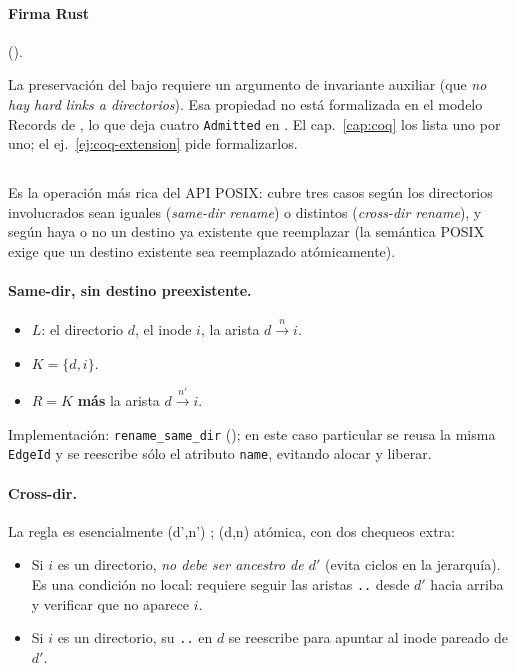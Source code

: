 \paragraph{Firma Rust} ().

\begin{observacion}
\label{obs:rmdir-coq}
La preservación del  bajo \oprmdir{} requiere
un argumento de invariante auxiliar (que \emph{no hay hard links a
directorios}). Esa propiedad no está formalizada en el modelo Records
de , lo que deja cuatro \texttt{Admitted} en
. El cap.~\ref{cap:coq} los lista uno por uno; el
ej.~\ref{ej:coq-extension} pide formalizarlos.
\end{observacion}

\subsection{\oprename}

Es la operación más rica del API POSIX: cubre tres casos según los
directorios involucrados sean iguales (\emph{same-dir rename}) o
distintos (\emph{cross-dir rename}), y según haya o no un destino
ya existente que reemplazar (la semántica POSIX exige que un destino
existente sea reemplazado atómicamente).

\paragraph{Same-dir, sin destino preexistente.}

\begin{itemize}
  \item $L$: el directorio $d$, el inode $i$, la arista $d \xrightarrow{n} i$.
  \item $K = \{d, i\}$.
  \item $R = K$ \textbf{más} la arista $d \xrightarrow{n'} i$.
\end{itemize}

Implementación: \texttt{rename\_same\_dir}
(); en este caso particular se
reusa la misma \texttt{EdgeId} y se reescribe sólo el atributo
\texttt{name}, evitando alocar y liberar.

\paragraph{Cross-dir.} La regla es esencialmente
\opcreate(d',n') ; \opunlink(d,n) atómica, con dos chequeos extra:
\begin{itemize}
  \item Si $i$ es un directorio, \emph{no debe ser ancestro de $d'$}
    (evita ciclos en la jerarquía). Es una condición no local: requiere
    seguir las aristas \texttt{..} desde $d'$ hacia arriba y verificar
    que no aparece $i$.
  \item Si $i$ es un directorio, su \texttt{..} en $d$ se reescribe para
    apuntar al inode pareado de $d'$.
\end{itemize}

